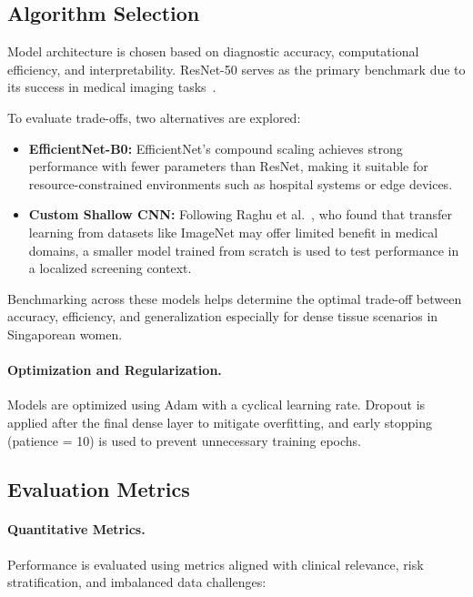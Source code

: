 \documentclass[12pt]{article}
\begin{document}
\subsection{Algorithm Selection}

Model architecture is chosen based on diagnostic accuracy, computational efficiency, and interpretability. ResNet-50 serves as the primary benchmark due to its success in medical imaging tasks~\cite{1,7}. 

To evaluate trade-offs, two alternatives are explored:

\begin{itemize}
    \item \textbf{EfficientNet-B0:} EfficientNet’s compound scaling achieves strong performance with fewer parameters than ResNet, making it suitable for resource-constrained environments such as hospital systems or edge devices.

    \item \textbf{Custom Shallow CNN:} Following Raghu et al.~\cite{2}, who found that transfer learning from datasets like ImageNet may offer limited benefit in medical domains, a smaller model trained from scratch is used to test performance in a localized screening context.
\end{itemize}

Benchmarking across these models helps determine the optimal trade-off between accuracy, efficiency, and generalization especially for dense tissue scenarios in Singaporean women.

\paragraph{Optimization and Regularization.}
Models are optimized using Adam with a cyclical learning rate. Dropout is applied after the final dense layer to mitigate overfitting, and early stopping (patience = 10) is used to prevent unnecessary training epochs.

\vspace{1em}

\subsection{Evaluation Metrics}

\paragraph{Quantitative Metrics.}
Performance is evaluated using metrics aligned with clinical relevance, risk stratification, and imbalanced data challenges:
\end{document}
